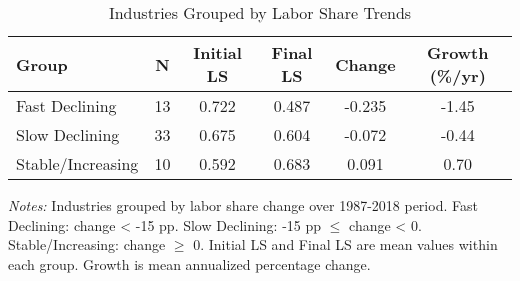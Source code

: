 \begin{table}[H]
\centering
\caption{Industries Grouped by Labor Share Trends}
\label{tab:labor_share_heterogeneity}
\small
\begin{tabular}{lccccc}
\toprule
Group & N & Initial LS & Final LS & Change & Growth (\%/yr) \\
\midrule
Fast Declining & 13 & 0.722 & 0.487 & -0.235 & -1.45 \\
Slow Declining & 33 & 0.675 & 0.604 & -0.072 & -0.44 \\
Stable/Increasing & 10 & 0.592 & 0.683 & 0.091 & 0.70 \\
\bottomrule
\end{tabular}
\begin{minipage}{\textwidth}
\vspace{0.2cm}
\footnotesize
\textit{Notes:} Industries grouped by labor share change over 1987-2018 period.
Fast Declining: change < -15 pp. Slow Declining: -15 pp $\leq$ change < 0. 
Stable/Increasing: change $\geq$ 0.
Initial LS and Final LS are mean values within each group.
Growth is mean annualized percentage change.
\end{minipage}
\end{table}
